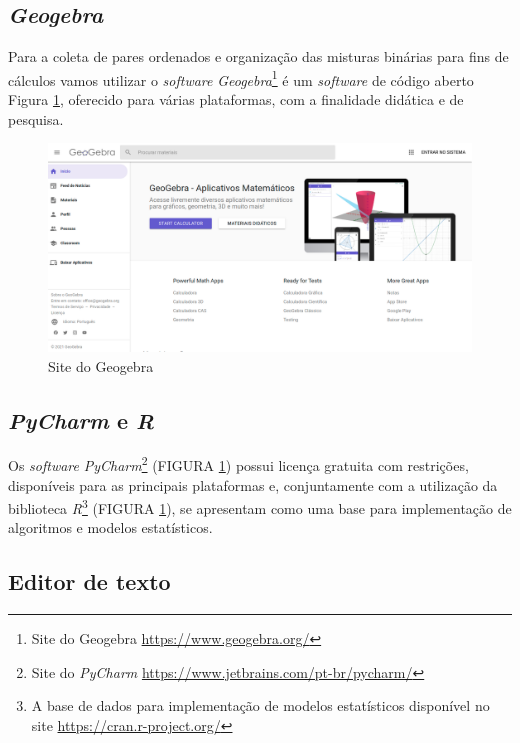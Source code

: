 \subsection{\textit{Geogebra}}
Para a coleta de pares ordenados e organização das misturas binárias para fins de cálculos vamos utilizar o \textit{software} \textit{Geogebra}\footnote{Site do Geogebra \url{https://www.geogebra.org/}} é um \textit{software} de código aberto Figura \ref{fig:11}, oferecido para várias plataformas, com a finalidade didática e de pesquisa. 
\begin{figure}[H]
	\centering
	\includegraphics[width=0.9\linewidth 
	]{dados/figuras/Geogebra_1.png}
	\caption[Site do Geogebra]{Site do Geogebra}
	\label{fig:11}
\end{figure}


\subsection{\textit{PyCharm} e \textit{R}}

Os \textit{software} \textit{PyCharm}\footnote{Site do \textit{PyCharm} \url{https://www.jetbrains.com/pt-br/pycharm/}} (FIGURA \ref{fig:11}) possui licença gratuita com restrições, disponíveis para as principais plataformas e, conjuntamente com a utilização da biblioteca \textit{R}\footnote{A base de dados para implementação de modelos estatísticos disponível no site \url{https://cran.r-project.org/}} (FIGURA \ref{fig:11}), se apresentam como uma base para implementação de algoritmos e modelos estatísticos. 



\subsection{Editor de texto \LaTeXe}

